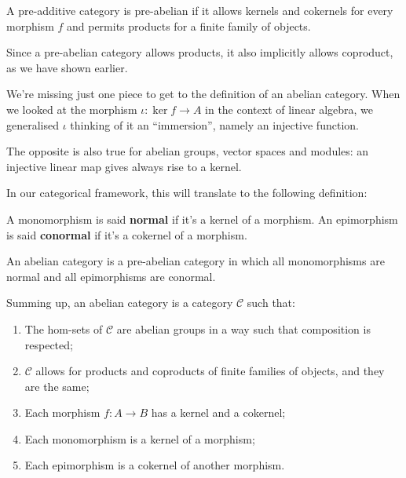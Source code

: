 \documentclass{beamer}
\begin{document}
\begin{frame}
    \begin{definition}
        A pre-additive category is pre-abelian if it allows kernels and cokernels for
        every morphism $f$ and permits products for a finite family of objects.
    \end{definition}

    Since a pre-abelian category allows products, it also implicitly allows
    coproduct, as we have shown earlier.
\end{frame}

\begin{frame}
    We're missing just one piece to get to the definition of an abelian category.
    When we looked at the morphism $\iota : \ker f \to A$ in the context of linear
    algebra, we generalised $\iota$ thinking of it an ``immersion'', namely an
    injective function. \medskip

    The opposite is also true for abelian groups, vector spaces and
    modules: an injective linear map gives always rise
    to a kernel.
\end{frame}

\begin{frame}
    In our categorical framework, this will translate to the following
    definition: \medskip

    \begin{definition}
        A monomorphism is said \textbf{normal} if it's a kernel of a morphism.
        An epimorphism is said \textbf{conormal} if it's a cokernel of a morphism.
    \end{definition}
\end{frame}

\begin{frame}
    \begin{definition}
        An abelian category is a pre-abelian category in which all monomorphisms are normal
        and all epimorphisms are conormal.
    \end{definition}

    Summing up, an abelian category is a category $\mathcal{C}$ such that:
    \begin{enumerate}
        \item The hom-sets of $\mathcal{C}$ are abelian groups in a way such that
            composition is respected;
        \item $\mathcal{C}$ allows for products and coproducts of finite families of objects, and
            they are the same;
        \item Each morphism $f : A \to B$ has a kernel and a cokernel;
        \item Each monomorphism is a kernel of a morphism;
        \item Each epimorphism is a cokernel of another morphism.
    \end{enumerate}
\end{frame}
\end{document}
